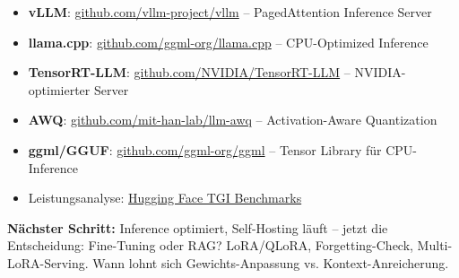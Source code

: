 \begin{itemize}[leftmargin=*]
    \item \textbf{vLLM}: \href{https://github.com/vllm-project/vllm}{github.com/vllm-project/vllm} -- PagedAttention Inference Server
    \item \textbf{llama.cpp}: \href{https://github.com/ggml-org/llama.cpp}{github.com/ggml-org/llama.cpp} -- CPU-Optimized Inference
    \item \textbf{TensorRT-LLM}: \href{https://github.com/NVIDIA/TensorRT-LLM}{github.com/NVIDIA/TensorRT-LLM} -- NVIDIA-optimierter Server
    \item \textbf{AWQ}: \href{https://github.com/mit-han-lab/llm-awq}{github.com/mit-han-lab/llm-awq} -- Activation-Aware Quantization
    \item \textbf{ggml/GGUF}: \href{https://github.com/ggml-org/ggml}{github.com/ggml-org/ggml} -- Tensor Library für CPU-Inference
    \item Leistungsanalyse: \href{https://huggingface.co/spaces/optimum/text-generation-inference-benchmarks}{Hugging Face TGI Benchmarks}
\end{itemize}

\textbf{Nächster Schritt:} Inference optimiert, Self-Hosting läuft -- jetzt die Entscheidung: Fine-Tuning oder RAG? LoRA/QLoRA, Forgetting-Check, Multi-LoRA-Serving. Wann lohnt sich Gewichts-Anpassung vs. Kontext-Anreicherung.
\endinput

\clearpage
